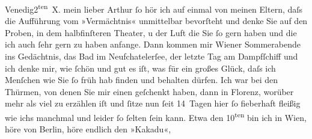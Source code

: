 \begin{ledgroupsized}[t]{13cm}
           \pstart
           \raggedleft{}Venedig2\textsuperscript{ten} X.\pend
           \pstart{}mein lieber Arthur\pend\pstart
           ſo hör ich auf einmal von meinen Eltern, daſs die Aufführung vom »Vermächtnis« unmittelbar bevorſteht und denke Sie auf den Proben,
               in dem halbfinſteren Theater, u der Luft die Sie ſo gern haben und die ich auch ſehr
               gern zu haben anfange. Dann kommen mir Wiener
               Sommerabende ins Gedächtnis, das Bad im Neufchatelerſee, der letzte {\pb}Tag am Dampfſchiff und ich denke
               mir, wie ſchön und gut es iſt, was für ein großes Glück, daſs ich Menſchen wie Sie ſo
               früh hab finden und behalten dürfen.\pend
           \pstart
           Ich war bei den Thürmen, von
               denen Sie mir einen geſchenkt haben, dann in Florenz, worüber mehr als viel zu erzählen iſt und
               ſitze nun ſeit 14 Tagen hier ſo fieberhaft fleißig wie ichs manchmal und leider ſo
               ſelten ſein kann. Etwa den 10\textsuperscript{ten} bin ich in Wien, höre von Berlin, höre endlich den »Kakadu«,

\end{ledgroupsized}
